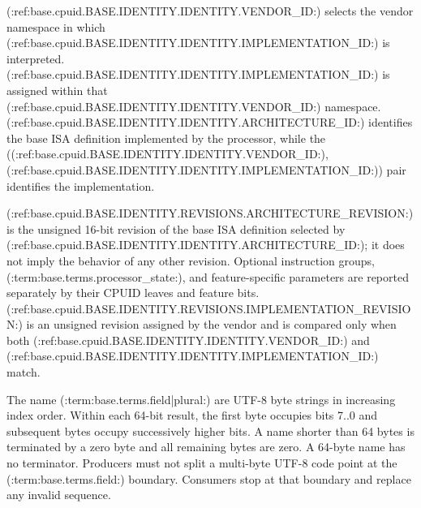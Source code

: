(:ref:base.cpuid.BASE.IDENTITY.IDENTITY.VENDOR_ID:) selects the vendor namespace in which (:ref:base.cpuid.BASE.IDENTITY.IDENTITY.IMPLEMENTATION_ID:) is interpreted.
(:ref:base.cpuid.BASE.IDENTITY.IDENTITY.IMPLEMENTATION_ID:) is assigned within that (:ref:base.cpuid.BASE.IDENTITY.IDENTITY.VENDOR_ID:) namespace.
(:ref:base.cpuid.BASE.IDENTITY.IDENTITY.ARCHITECTURE_ID:) identifies the base ISA definition implemented by the processor, while the
((:ref:base.cpuid.BASE.IDENTITY.IDENTITY.VENDOR_ID:), (:ref:base.cpuid.BASE.IDENTITY.IDENTITY.IMPLEMENTATION_ID:)) pair identifies the implementation.

(:ref:base.cpuid.BASE.IDENTITY.REVISIONS.ARCHITECTURE_REVISION:) is the unsigned 16-bit revision of the base ISA definition selected by
(:ref:base.cpuid.BASE.IDENTITY.IDENTITY.ARCHITECTURE_ID:); it does not imply the behavior of any other revision. Optional instruction groups,
(:term:base.terms.processor_state:), and feature-specific parameters are reported separately by their CPUID leaves and feature bits.
(:ref:base.cpuid.BASE.IDENTITY.REVISIONS.IMPLEMENTATION_REVISION:) is an unsigned revision assigned
by the vendor and is compared only when both (:ref:base.cpuid.BASE.IDENTITY.IDENTITY.VENDOR_ID:) and (:ref:base.cpuid.BASE.IDENTITY.IDENTITY.IMPLEMENTATION_ID:) match.

The name (:term:base.terms.field|plural:) are UTF-8 byte strings in increasing index order. Within each 64-bit result, the first byte occupies
bits 7..0 and subsequent bytes occupy successively higher bits. A name shorter than 64 bytes is terminated by a zero
byte and all remaining bytes are zero. A 64-byte name has no terminator. Producers must not split a multi-byte UTF-8
code point at the (:term:base.terms.field:) boundary. Consumers stop at that boundary and replace any invalid sequence.
